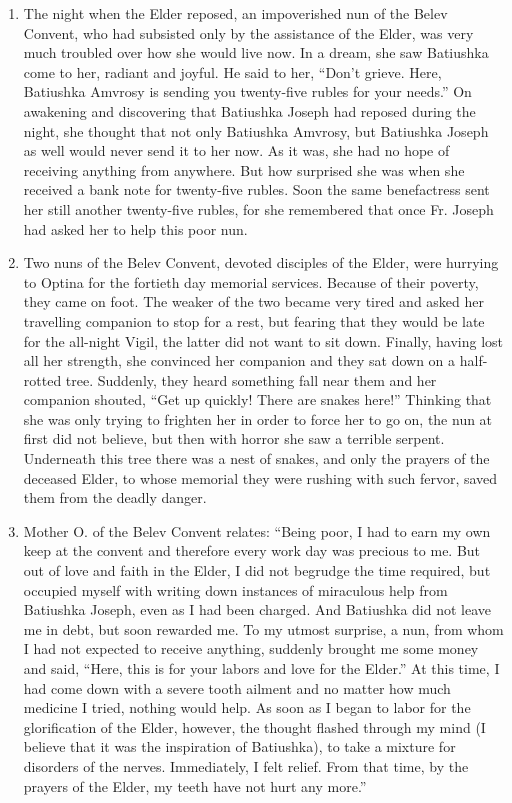 \begin{enumerate}
\item The night when the Elder reposed, an impoverished nun of the Belev Convent, who had subsisted only by the assistance of the Elder, was very much troubled over how she would live now. In a dream, she saw Batiushka come to her, radiant and joyful. He said to her, “Don't grieve. Here, Batiushka Amvrosy is sending you twenty-five rubles for your needs.” On awakening and discovering that Batiushka Joseph had reposed during the night, she thought that not only Batiushka Amvrosy, but Batiushka Joseph as well would never send it to her now. As it was, she had no hope of receiving anything from anywhere. But how surprised she was when she received a bank note for twenty-five rubles. Soon the same benefactress sent her still another twenty-five rubles, for she remembered that once Fr. Joseph had asked her to help this poor nun.

\item Two nuns of the Belev Convent, devoted disciples of the Elder, were hurrying to Optina for the fortieth day memorial services. Because of their poverty, they came on foot. The weaker of the two became very tired and asked her travelling companion to stop for a rest, but fearing that they would be late for the all-night Vigil, the latter did not want to sit down. Finally, having lost all her strength, she convinced her companion and they sat down on a half-rotted tree. Suddenly, they heard something fall near them and her companion shouted, “Get up quickly! There are snakes here!” Thinking that she was only trying to frighten her in order to force her to go on, the nun at first did not believe, but then with horror she saw a terrible serpent. Underneath this tree there was a nest of snakes, and only the prayers of the deceased Elder, to whose memorial they were rushing with such fervor, saved them from the deadly danger.

\item Mother O. of the Belev Convent relates: “Being poor, I had to earn my own keep at the convent and therefore every work day was precious to me. But out of love and faith in the Elder, I did not begrudge the time required, but occupied myself with writing down instances of miraculous help from Batiushka Joseph, even as I had been charged. And Batiushka did not leave me in debt, but soon rewarded me. To my utmost surprise, a nun, from whom I had not expected to receive anything, suddenly brought me some money and said, “Here, this is for your labors and love for the Elder.” At this time, I had come down with a severe tooth ailment and no matter how much medicine I tried, nothing would help. As soon as I began to labor for the glorification of the Elder, however, the thought flashed through my mind (I believe that it was the inspiration of Batiushka), to take a mixture for disorders of the nerves. Immediately, I felt relief. From that time, by the prayers of the Elder, my teeth have not hurt any more.”


\end{enumerate}
